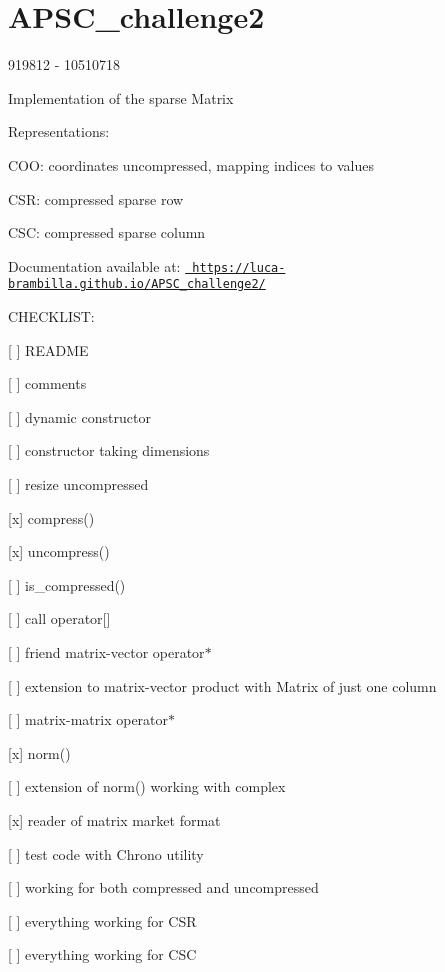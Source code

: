 \chapter{APSC\+\_\+challenge2}
\hypertarget{md_README}{}\label{md_README}
\label{md_README_autotoc_md0}%
%
 919812 -\/ 10510718

Implementation of the sparse Matrix

Representations\+:


\begin{DoxyItemize}
\item COO\+: coordinates uncompressed, mapping indices to values
\item CSR\+: compressed sparse row
\item CSC\+: compressed sparse column
\end{DoxyItemize}

Documentation available at\+: \href{https://luca-brambilla.github.io/APSC_challenge2/}{\texttt{ https\+://luca-\/brambilla.\+github.\+io/\+APSC\+\_\+challenge2/}}

CHECKLIST\+:


\begin{DoxyItemize}
\item \mbox{[} \mbox{]} README
\item \mbox{[} \mbox{]} comments
\item \mbox{[} \mbox{]} dynamic constructor
\item \mbox{[} \mbox{]} constructor taking dimensions
\item \mbox{[} \mbox{]} resize uncompressed
\item \mbox{[}x\mbox{]} {\ttfamily compress()}
\item \mbox{[}x\mbox{]} {\ttfamily uncompress()}
\item \mbox{[} \mbox{]} {\ttfamily is\+\_\+compressed()}
\item \mbox{[} \mbox{]} call {\ttfamily operator\mbox{[}\mbox{]}}
\item \mbox{[} \mbox{]} friend matrix-\/vector {\ttfamily operator\texorpdfstring{$\ast$}{*}}
\item \mbox{[} \mbox{]} extension to matrix-\/vector product with {\ttfamily Matrix} of just one column
\item \mbox{[} \mbox{]} matrix-\/matrix {\ttfamily operator\texorpdfstring{$\ast$}{*}}
\item \mbox{[}x\mbox{]} {\ttfamily norm()}
\item \mbox{[} \mbox{]} extension of {\ttfamily norm()} working with complex
\item \mbox{[}x\mbox{]} reader of matrix market format
\item \mbox{[} \mbox{]} test code with {\ttfamily Chrono} utility
\item \mbox{[} \mbox{]} working for both compressed and uncompressed
\item \mbox{[} \mbox{]} everything working for CSR
\item \mbox{[} \mbox{]} everything working for CSC 
\end{DoxyItemize}